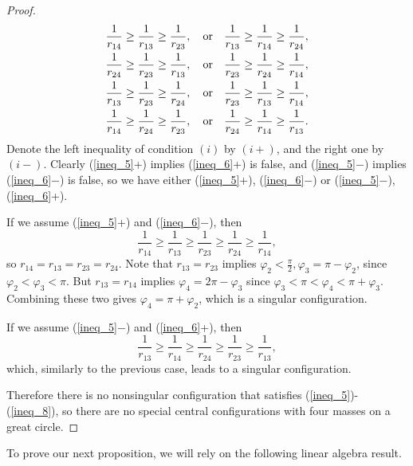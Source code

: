 \documentclass[12pt]{amsart}
\theoremstyle{definition}
\def \vp{\varphi}       %
\begin{document}
{\begin{proof}
\begin{align} 
  \frac{1}{r_{14}}&\ge\frac{1}{r_{13}}\ge\frac{1}{r_{23}},   \ \ \ {\rm or}\ \ \ \frac{1}{r_{13}}\ge\frac{1}{r_{14}}\ge \frac{1}{r_{24}}, \label{ineq_5} \\
  \frac{1}{r_{24}}&\ge\frac{1}{r_{23}}\ge\frac{1}{r_{13}},   \ \ \ {\rm or}\ \ \ \frac{1}{r_{23}}\ge\frac{1}{r_{24}}\ge \frac{1}{r_{14}}, \label{ineq_6} \\ \frac{1}{r_{13}}&\ge\frac{1}{r_{23}}\ge\frac{1}{r_{24}},   \ \ \ {\rm or} \ \ \ \frac{1}{r_{23}}\ge\frac{1}{r_{13}}\ge \frac{1}{r_{14}}, \label{ineq_7} \\ \frac{1}{r_{14}}&\ge\frac{1}{r_{24}}\ge\frac{1}{r_{23}},   \ \ \ {\rm or}\ \ \ \frac{1}{r_{24}}\ge\frac{1}{r_{14}}\ge \frac{1}{r_{13}}. \label{ineq_8}   
   \end{align}
 Denote the left inequality of condition $(i)$ by $(i+)$, and the right one by $(i-)$.  Clearly (\ref{ineq_5}+) implies (\ref{ineq_6}+) is false, and (\ref{ineq_5}$-$) implies (\ref{ineq_6}$-$) is false, so we have either  (\ref{ineq_5}+),  (\ref{ineq_6}$-$) or (\ref{ineq_5}$-$), (\ref{ineq_6}+).
\smallskip

If we assume  (\ref{ineq_5}+) and  (\ref{ineq_6}$-$), then \begin{equation*}
 \frac{1}{r_{14}}\ge\frac{1}{r_{13}}\ge\frac{1}{r_{23}}\ge\frac{1}{r_{24}}\ge \frac{1}{r_{14}},
\end{equation*}
so $r_{14}=r_{13}=r_{23}=r_{24}$. Note that $r_{13}=r_{23}$ implies $\vp_2<\frac{\pi}{2}, \vp_3=\pi-\vp_2$, since $\vp_2<\vp_3<\pi$. But $r_{13}=r_{14}$ implies $\vp_4=2\pi-\vp_3$ since $\vp_3<\pi<\vp_4<\pi+\vp_3$. Combining these two gives $\vp_4=\pi+\vp_2$, which is a singular configuration.
\smallskip

If we assume (\ref{ineq_5}$-$) and (\ref{ineq_6}+), then \begin{equation*} 
\frac{1}{r_{13}}\ge\frac{1}{r_{14}}\ge \frac{1}{r_{24}}\ge\frac{1}{r_{23}}\ge\frac{1}{r_{13}},
\end{equation*}
which, similarly to the previous case, leads to a singular configuration.
\smallskip

Therefore there is no nonsingular configuration that satisfies (\ref{ineq_5})-(\ref{ineq_8}), so there are no special central configurations with four masses on a great circle.
\end{proof}

To prove our next proposition, we will rely on the following linear algebra result.


}
\end{document}
